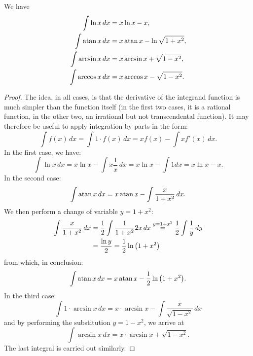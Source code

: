 \begin{theorem}
\mymark{***}
We have
\begin{align*}
  \int \ln x\, dx  &= x \ln x - x, \\
  \int \operatorname{atan} x\, dx &= x \operatorname{atan} x - \ln \sqrt{1+x^2},\\
  \int \arcsin x\, dx &= x \arcsin x + \sqrt{1-x^2},\\
  \int \arccos x\, dx &= x \arccos x - \sqrt{1-x^2}.
\end{align*}
\end{theorem}
%
\begin{proof}
\mymark{***}
The idea, in all cases, is that the derivative of the integrand function is much
simpler than the function itself (in the first two cases, it is a rational
function, in the other two, an irrational but not transcendental function). It
may therefore be useful to apply integration by parts in the form:
\[
  \int f(x)\, dx = \int 1\cdot f(x)\, dx = x f(x) - \int x f'(x)\, dx.
\]
In the first case, we have:
\[
\int \ln x\, dx = x \ln x - \int x \frac{1}{x}\, dx
 = x \ln x - \int 1 dx = x \ln x - x.
\]
In the second case:
\[
\int \operatorname{atan} x\, dx = x \operatorname{atan} x - \int \frac{x}{1+x^2}\, dx.
\]
We then perform a change of variable $y=1+x^2$:
\begin{align*}
\int \frac{x}{1+x^2}\, dx
&= \frac{1}{2}\int \frac{1}{1+x^2} 2x \, dx
\stackrel{y=1+x^2} = \frac{1}{2}\int \frac 1 y\, dy \\
&= \frac{\ln y}{2} = \frac{1}{2}\ln{\left( 1+x^2 \right)}
\end{align*}
from which, in conclusion:
\[
 \int \operatorname{atan} x\, dx = x \operatorname{atan} x - \frac 1 2 \ln{\left( 1+x^2 \right)}.
\]
In the third case:
\[
 \int 1\cdot \arcsin x\, dx = x\cdot \arcsin x - \int\frac{x}{\sqrt{1-x^2}}\, dx  
\]
and by performing the substitution $y=1-x^2$, we arrive at 
\[
  \int \arcsin x\, dx = x \cdot \arcsin x + \sqrt{1-x^2}.  
\]
The last integral is carried out similarly.
\end{proof}

